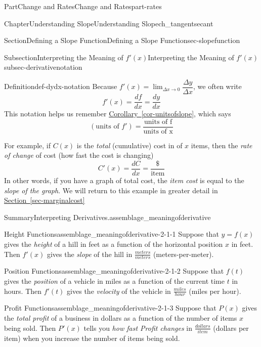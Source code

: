 \documentclass{tufte-book}
\newcommand{\xreffont}{\relax}
\numberwithin{equation}{chapter}
\begin{document}
\begin{partptx}{Part}{Change and Rates}{}{Change and Rates}{}{}{part-rates}
\begin{chapterptx}{Chapter}{Understanding Slope}{}{Understanding Slope}{}{}{ch_tangentsecant}
\begin{sectionptx}{Section}{Defining a Slope Function}{}{Defining a Slope Function}{}{}{sec-slopefunction}
\begin{subsectionptx}{Subsection}{Interpreting the Meaning of \(f'(x)\)}{}{Interpreting the Meaning of \(f'(x)\)}{}{}{subsec-derivativenotation}
\begin{definition}{Definition}{}{def-dydx-notation}
Because \(f'(x) = \lim_{\Delta x\rightarrow 0} \dfrac{\Delta y}{\Delta x}\), we often write%
\begin{equation*}
f'(x) = \dfrac{df}{dx} = \dfrac{dy}{dx}
\end{equation*}
This notation helps us remember \hyperref[cor-unitsofslope]{Corollary~{\xreffont\ref{cor-unitsofslope}}}, which says%
\begin{equation*}
(\text{units of }f') = \dfrac{\text{units of f}}{\text{units of x}}
\end{equation*}
%
\end{definition}
For example, if \(C(x)\) is the \emph{total} (cumulative) cost in \textdollar{} of \(x\) items, then the \emph{rate of change} of cost (how fast the cost is changing)%
\begin{equation*}
C'(x) = \dfrac{dC}{dx} = \dfrac{\$}{\text{item}}
\end{equation*}
In other words, if you have a graph of total cost, the \emph{item cost} is equal to the \emph{slope of the graph}. We will return to this example in greater detail in \hyperref[sec-marginalcost]{Section~{\xreffont\ref{sec-marginalcost}}}%
\begin{assemblage}{Summary}{Interpreting Derivatives.}{assemblage_meaningofderivative}%
%
\begin{descriptionlist}
\begin{dlimedium}{Height Functions}{assemblage_meaningofderivative-2-1-1}%
Suppose that \(y=f(x)\) gives the \emph{height} of a hill in feet as a function of the horizontal position \(x\) in feet. Then \(f'(x)\) gives the \emph{slope} of the hill in \(\frac{meters}{meters}\) (meters-per-meter).%
\end{dlimedium}%
\begin{dlimedium}{Position Functions}{assemblage_meaningofderivative-2-1-2}%
Suppose that \(f(t)\) gives the \emph{position} of a vehicle in miles as a function of the current time \(t\) in hours. Then \(f'(t)\) gives the \emph{velocity} of the vehicle in \(\frac{miles}{hour}\) (miles per hour).%
\end{dlimedium}%
\begin{dlimedium}{Profit Functions}{assemblage_meaningofderivative-2-1-3}%
Suppose that \(P(x)\) gives the \emph{total profit} of a business in dollars as a function of the number of items \(x\) being sold. Then \(P'(x)\) tells you  \emph{how fast Profit changes} in \(\frac{dollars}{item}\) (dollars per item) when you increase the number of items being sold.%
\end{dlimedium}%

\end{descriptionlist}
\end{assemblage}
\end{subsectionptx}
\end{sectionptx}
\end{chapterptx}
\end{partptx}
\end{document}
